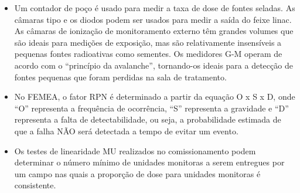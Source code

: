 \documentclass[11pt,a4paper]{article}
\newcounter{exemplo}
\begin{document}
\begin{exemplo}
\begin{itemize}
        \item Um contador de poço é usado para medir a taxa de dose de fontes seladas. As câmaras tipo e os diodos podem ser usados para medir a saída do feixe linac. As câmaras de ionização de monitoramento externo têm grandes volumes que são ideais para medições de exposição, mas são relativamente insensíveis a pequenas fontes radioativas como sementes. Os medidores G-M operam de acordo com o “princípio da avalanche”, tornando-os ideais para a detecção de fontes pequenas que foram perdidas na sala de tratamento.
        
        \item No FEMEA, o fator RPN é determinado a partir da equação O x S x D, onde  “O” representa a frequência de ocorrência, “S” representa a gravidade e “D” representa a falta de detectabilidade, ou seja, a probabilidade estimada de que a falha NÃO será detectada a tempo de evitar um evento.
        
        \item Os testes de linearidade MU realizados no comissionamento podem determinar o número mínimo de unidades monitoras a serem entregues por um campo nas quais a proporção de dose para unidades monitoras é consistente.

    \end{itemize}
\end{exemplo}
\end{document}
